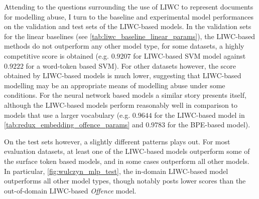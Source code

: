 Attending to the questions surrounding the use of LIWC to represent documents for modelling abuse, I turn to the baseline and experimental model performances on the validation and test sets of the LIWC-based models. In the validation sets for the linear baselines (see \cref{tab:liwc_baseline_linear_params}), the LIWC-based methods do not outperform any other model type, for some datasets, a highly competitive score is obtained (e.g. $0.9207$ for LIWC-based SVM model against $0.9222$ for a word-token based SVM). For other datasets however, the score obtained by LIWC-based models is much lower, suggesting that LIWC-based modelling may be an appropriate means of modelling abuse under some conditions.
For the neural network based models a similar story presents itself, although the LIWC-based models perform reasonably well in comparison to models that use a larger vocabulary (e.g. $0.9644$ for the LIWC-based model in \cref{tab:redux_embedding_offence_params} and $0.9783$ for the BPE-based model).

On the test sets however, a slightly different patterns plays out. For most evaluation datasets, at least one of the LIWC-based models outperform some of the surface token based models, and in some cases outperform all other models. In particular, \cref{fig:wulczyn_mlp_test}, the in-domain LIWC-based model outperforms all other model types, though notably posts lower scores than the out-of-domain LIWC-based \textit{Offence} model.

